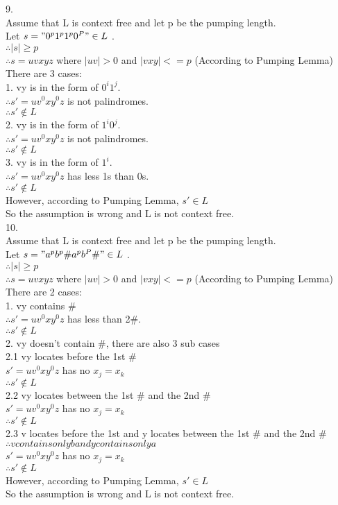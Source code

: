 \documentclass[a4paper]{article}
\begin{document}
9.\\
Assume that L is context free and let p be the pumping length.\\
Let $s =  " 0^p1^p1^p0^P " \in L$ .\\
$\therefore |s| \geqslant p$ \\
$\therefore s=uvxyz$ where $|uv|>0$ and $|vxy| <= p$ (According to Pumping Lemma)\\
There are 3 cases:\\
1. vy is in the form of $0^i1^j$. \\
$\therefore s'=uv^0xy^0z$ is not palindromes. \\
$\therefore s'\notin L$\\
2. vy is in the form of $1^i0^j$. \\
$\therefore s'=uv^0xy^0z$ is not palindromes. \\
$\therefore s'\notin L$\\
3. vy is in the form of $1^i$. \\
$\therefore s'=uv^0xy^0z$ has less 1s than 0s. \\
$\therefore s'\notin L$\\
However, according to Pumping Lemma, $s'\in L$\\
So the assumption is wrong and L is not context free.\\

10.\\
Assume that L is context free and let p be the pumping length.\\
Let $s =  " a^pb^p\#a^pb^P\# " \in L$ .\\
$\therefore |s| \geqslant p$ \\
$\therefore s=uvxyz$ where $|uv|>0$ and $|vxy| <= p$ (According to Pumping Lemma)\\
There are 2 cases:\\
1. vy contains $\#$ \\
$\therefore s'=uv^0xy^0z$ has less than 2\#. \\
$\therefore s'\notin L$\\
2. vy doesn't contain \#, there are also 3 sub cases\\
2.1 vy locates before the 1st \#\\
$s'=uv^0xy^0z$ has no $x_j=x_k$\\
$\therefore s'\notin L$\\
2.2 vy locates between the 1st \# and the 2nd \#\\
$s'=uv^0xy^0z$ has no $x_j=x_k$\\
$\therefore s'\notin L$\\
2.3 v locates before the 1st and y locates between the 1st \# and the 2nd \#\\
$\therefore v contains only b and y contains only a$\\
$s'=uv^0xy^0z$ has no $x_j=x_k$\\
$\therefore s'\notin L$\\
However, according to Pumping Lemma, $s'\in L$\\
So the assumption is wrong and L is not context free.\\
\end{document}
